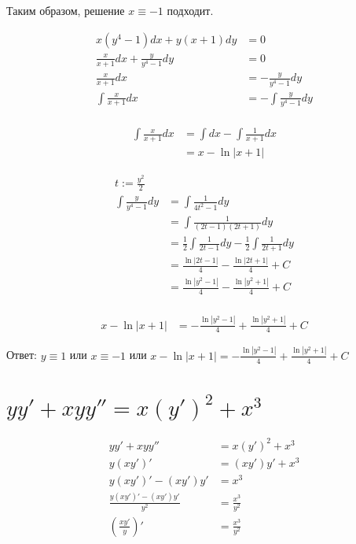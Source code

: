Таким образом, решение $x \equiv -1$ подходит.

\begin{align*}
    x(y^4-1)dx+y(x+1)dy               & = 0                       \\
    \frac{x}{x+1}dx+\frac{y}{y^4-1}dy & = 0                       \\
    \frac{x}{x+1}dx                   & = -\frac{y}{y^4-1}dy      \\
    \int \frac{x}{x+1}dx              & = -\int \frac{y}{y^4-1}dy \\
\end{align*}

\begin{align*}
    \int \frac{x}{x+1}dx & = \int dx - \int \frac{1}{x+1}dx \\
                         & = x - \ln|x+1|
\end{align*}

\begin{align*}
    t := \frac{y^2}{2}                                                                               \\
    \int \frac{y}{y^4-1}dy & = \int \frac{1}{4t^2 - 1} dy                                            \\
                           & = \int \frac{1}{(2t-1)(2t+1)} dy                                        \\
                           & = \frac{1}{2}\int \frac{1}{2t-1} dy - \frac{1}{2}\int \frac{1}{2t+1} dy \\
                           & = \frac{\ln|2t-1|}{4} -  \frac{\ln|2t+1|}{4}  + C                       \\
                           & = \frac{\ln|y^2-1|}{4} -  \frac{\ln|y^2+1|}{4} + C                      \\
\end{align*}

\begin{align*}
    x - \ln|x+1| & = - \frac{\ln|y^2-1|}{4} + \frac{\ln|y^2+1|}{4} + C
\end{align*}

Ответ: $y \equiv 1$ или $x \equiv -1$ или $x - \ln|x+1| = - \frac{\ln|y^2-1|}{4} + \frac{\ln|y^2+1|}{4} + C$

\section{$yy'+xyy''=x(y')^2+x^3$}

\begin{align*}
    yy'+xyy''                     & = x(y')^2+x^3     \\
    y(xy')'                       & = (xy')y' + x^3   \\
    y(xy')' - (xy')y'             & = x^3             \\
    \frac{y(xy')' - (xy')y'}{y^2} & = \frac{x^3}{y^2} \\
    \left(\frac{xy'}{y}\right)'   & = \frac{x^3}{y^2} \\
\end{align*}

